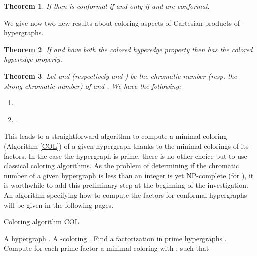 \documentclass[copyright]{eptcs}
\newtheorem{Theo}{Theorem}
\newcommand{\chg}[1]{{#1}}
\begin{document}
\begin{Theo}\label{ThmConformalCartesianStable} If  then  is conformal if and only if   and   are conformal.
\end{Theo}



\noindent We give now two new results about coloring aspects of Cartesian products of hypergraphs.

\begin{Theo}

 If  and  \chg{have} both the colored hyperedge property then  has the colored hyperedge property.
\end{Theo}


\begin{Theo} Let  and  (respectively  and ) be the chromatic number (resp. the strong chromatic number) of  and . We have the following:
\begin{enumerate}
\item 
\item .
\end{enumerate}
\end{Theo}


This leads to a straightforward algorithm to compute a minimal coloring (Algorithm \ref{COL}) of a given hypergraph  thanks to the minimal colorings of its factors. In the case the hypergraph is prime, there is no other choice but to use classical coloring algorithms. As the problem of determining if the chromatic number of a given hypergraph is less than an integer  is yet NP-complete (for ), it is worthwhile to add this preliminary step at the beginning of the investigation. An algorithm specifying how to compute the factors for conformal hypergraphs will be given in the following pages.

\begin{algorithm}
        \caption{Coloring algorithm COL}
        \label{COL}
        \begin{algorithmic}[1]
        \REQUIRE A hypergraph .
        \ENSURE A -coloring .
    \STATE Find a factorization in prime hypergraphs .
    \STATE Compute for each prime factor  a minimal coloring
     with .
    \RETURN  such that 
    \end{algorithmic}
    \end{algorithm}
\end{document}
